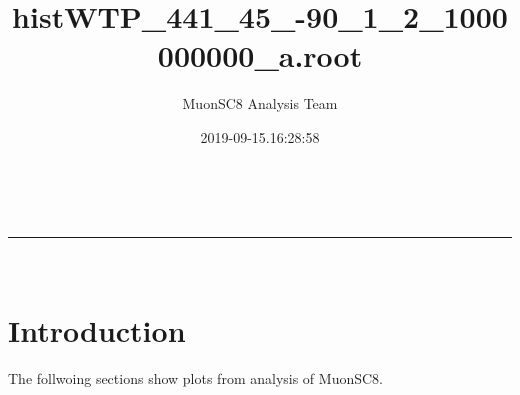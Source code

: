 \documentclass[a4paper,11pt]{article}
\makeatletter
\newcommand{\linia}{\rule{\linewidth}{0.5pt}}
\theoremstyle{mytheor}
\renewcommand{\maketitle}{
\begin{center}
\vspace{2ex}
{\huge \textsc{\@title}}
\vspace{1ex}
\\
\linia\\
\@author \hfill \@date
\vspace{4ex}
\end{center}
}
\makeatother
\begin{document}
\title{histWTP\_441\_45\_-90\_1\_2\_1000000000\_a.root}

\author{MuonSC8 Analysis Team }

\date{2019-09-15.16:28:58}

\maketitle

\section{Introduction}

The follwoing sections show plots from analysis of MuonSC8. 





\end{document}
